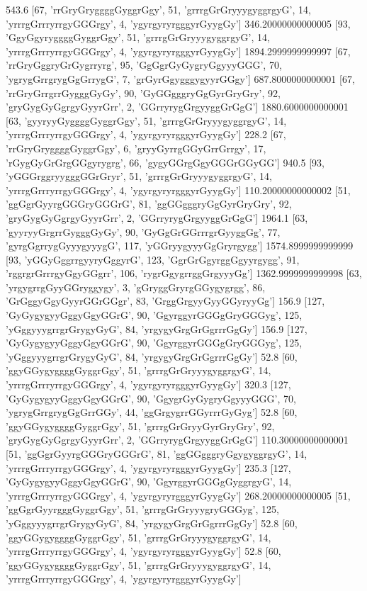 543.6 [67, 'rrGryGryggggGyggrGgy', 51, 'grrrgGrGryyygyggrgyG', 14, 'yrrrgGrrryrrgyGGGrgy', 4, 'ygyrgyryrgggyrGyygGy']
346.20000000000005 [93, 'GgyGgyryggggGyggrGgy', 51, 'grrrgGrGryyygyggrgyG', 14, 'yrrrgGrrryrrgyGGGrgy', 4, 'ygyrgyryrgggyrGyygGy']
1894.2999999999997 [67, 'rrGryGggryGrGygrryrg', 95, 'GgGgrGyGygryGgyyyGGG', 70, 'ygrygGrrgrygGgGrrygG', 7, 'grGyrGgygggygyyrGGgy']
687.8000000000001 [67, 'rrGryGrrgrrGygggGyGy', 90, 'GyGGgggryGgGyrGryGry', 92, 'gryGygGyGgrgyGyyrGrr', 2, 'GGrryrygGrgyyggGrGgG']
1880.6000000000001 [63, 'gyyryyGyggggGyggrGgy', 51, 'grrrgGrGryyygyggrgyG', 14, 'yrrrgGrrryrrgyGGGrgy', 4, 'ygyrgyryrgggyrGyygGy']
228.2 [67, 'rrGryGryggggGyggrGgy', 6, 'gryyGyrrgGGyGrrGrrgy', 17, 'rGygGyGrGrgGGgyrygrg', 66, 'gygyGGrgGgyGGGrGGyGG']
940.5 [93, 'yGGGrggryygggGGrGryr', 51, 'grrrgGrGryyygyggrgyG', 14, 'yrrrgGrrryrrgyGGGrgy', 4, 'ygyrgyryrgggyrGyygGy']
110.20000000000002 [51, 'ggGgrGyyrgGGGryGGGrG', 81, 'ggGGgggryGgGyrGryGry', 92, 'gryGygGyGgrgyGyyrGrr', 2, 'GGrryrygGrgyyggGrGgG']
1964.1 [63, 'gyyryyGrgrrGygggGyGy', 90, 'GyGgGrGGrrrgrGyyggGg', 77, 'gyrgGgrrygGyyygyyygG', 117, 'yGGryygyyyGgGryrgygg']
1574.8999999999999 [93, 'yGGyGggrrgyyryGggyrG', 123, 'GgrGrGgyrggGgyyrgygg', 91, 'rggrgrGrrrgyGgyGGgrr', 106, 'rygrGgygrrggGrgyyyGg']
1362.9999999999998 [63, 'yrgygrrgGyyGGryggygy', 3, 'gGryggGryrgGGygygrgg', 86, 'GrGggyGgyGyyrGGrGGgr', 83, 'GrggGrgyyGyyGGyryyGg']
156.9 [127, 'GyGygygyyGggyGgyGGrG', 90, 'GgyrggyrGGGgGryGGGyg', 125, 'yGggyyygrrgrGrygyGyG', 84, 'yrgygyGrgGrGgrrrGgGy']
156.9 [127, 'GyGygygyyGggyGgyGGrG', 90, 'GgyrggyrGGGgGryGGGyg', 125, 'yGggyyygrrgrGrygyGyG', 84, 'yrgygyGrgGrGgrrrGgGy']
52.8 [60, 'ggyGGygyggggGyggrGgy', 51, 'grrrgGrGryyygyggrgyG', 14, 'yrrrgGrrryrrgyGGGrgy', 4, 'ygyrgyryrgggyrGyygGy']
320.3 [127, 'GyGygygyyGggyGgyGGrG', 90, 'GgygrGyGygryGgyyyGGG', 70, 'ygrygGrrgrygGgGrrGGy', 44, 'ggGrgygrrGGyrrrGyGyg']
52.8 [60, 'ggyGGygyggggGyggrGgy', 51, 'grrrgGrGryyGyrGryGry', 92, 'gryGygGyGgrgyGyyrGrr', 2, 'GGrryrygGrgyyggGrGgG']
110.30000000000001 [51, 'ggGgrGyyrgGGGryGGGrG', 81, 'ggGGgggryGgygyggrgyG', 14, 'yrrrgGrrryrrgyGGGrgy', 4, 'ygyrgyryrgggyrGyygGy']
235.3 [127, 'GyGygygyyGggyGgyGGrG', 90, 'GgyrggyrGGGgGyggrgyG', 14, 'yrrrgGrrryrrgyGGGrgy', 4, 'ygyrgyryrgggyrGyygGy']
268.20000000000005 [51, 'ggGgrGyyrgggGyggrGgy', 51, 'grrrgGrGryyygryGGGyg', 125, 'yGggyyygrrgrGrygyGyG', 84, 'yrgygyGrgGrGgrrrGgGy']
52.8 [60, 'ggyGGygyggggGyggrGgy', 51, 'grrrgGrGryyygyggrgyG', 14, 'yrrrgGrrryrrgyGGGrgy', 4, 'ygyrgyryrgggyrGyygGy']
52.8 [60, 'ggyGGygyggggGyggrGgy', 51, 'grrrgGrGryyygyggrgyG', 14, 'yrrrgGrrryrrgyGGGrgy', 4, 'ygyrgyryrgggyrGyygGy']
